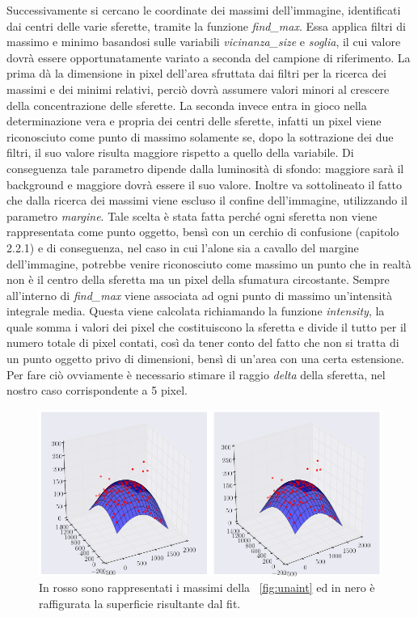 Successivamente si cercano le coordinate dei massimi dell'immagine, identificati dai centri delle varie sferette, tramite la funzione \textit{find\_max}. 
Essa applica filtri di massimo e minimo basandosi sulle variabili \textit{vicinanza\_size} e \textit{soglia}, il cui valore dovrà essere opportunatamente variato a seconda del campione di riferimento. 
La prima dà la dimensione in pixel dell'area sfruttata dai filtri per la ricerca dei massimi e dei minimi relativi, perciò dovrà assumere valori minori al crescere della concentrazione delle sferette. 
La seconda invece entra in gioco nella determinazione vera e propria dei centri delle sferette, infatti un pixel viene riconosciuto come punto di massimo solamente se, dopo la sottrazione dei due filtri, il suo valore risulta maggiore rispetto a quello della variabile. 
Di conseguenza tale parametro dipende dalla luminosità di sfondo: maggiore sarà il background e maggiore dovrà essere il suo valore.
Inoltre va sottolineato il fatto che dalla ricerca dei massimi viene escluso il confine dell'immagine, utilizzando il parametro \textit{margine}. 
Tale scelta è stata fatta perché ogni sferetta non viene rappresentata come punto oggetto, bensì con un cerchio di confusione (capitolo 2.2.1) e di conseguenza, nel caso in cui l'alone sia a cavallo del margine dell'immagine, potrebbe venire riconosciuto come massimo un punto che in realtà non è il centro della sferetta ma un pixel della sfumatura circostante.
Sempre all'interno di \textit{find\_max} viene associata ad ogni punto di massimo un'intensità integrale media. 
Questa viene calcolata richiamando la funzione \textit{intensity}, la quale somma i valori dei pixel che costituiscono la sferetta e divide il tutto per il numero totale di pixel contati, così da tener conto del fatto che non si tratta di un punto oggetto privo di dimensioni, bensì di un'area con una certa estensione. 
Per fare ciò ovviamente è necessario stimare il raggio \textit{delta} della sferetta, nel nostro caso corrispondente a 5 pixel.

\begin{figure}
 \centering
 \includegraphics[scale=0.50]{img/CAP3gauss.png}
 \caption{\small{In rosso sono rappresentati i massimi della \figurename~\ref{fig:unaint} ed in nero è raffigurata la superficie risultante dal fit.}}
 \label{fig:gauss}
\end{figure}

